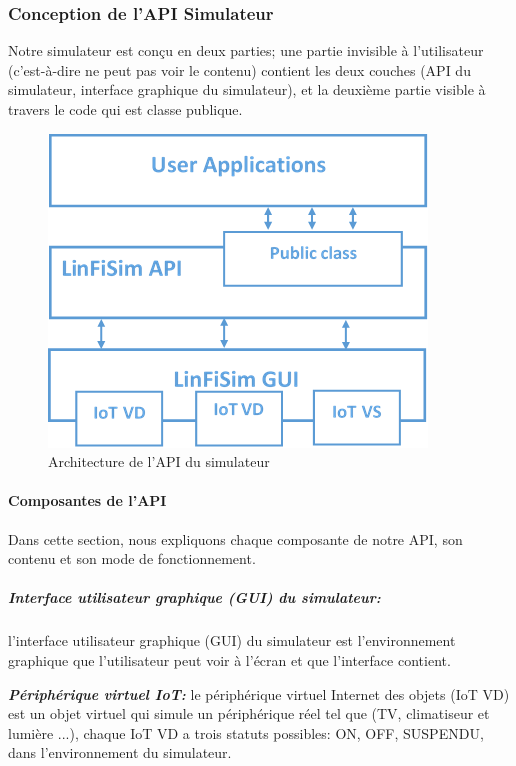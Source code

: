 \subsubsection{Conception de l'API Simulateur}
Notre simulateur est conçu en deux parties; une partie invisible à l'utilisateur (c'est-à-dire ne peut pas voir le contenu) contient les deux couches (API du simulateur, interface graphique du simulateur), et la deuxième partie visible à travers le code qui est classe publique.
\begin{figure}[H]
\centering
\includegraphics[scale=0.8]{chap1/fc15.png}
\caption{Architecture de l'API du simulateur}
\label{fc14}
\end{figure}

\paragraph{Composantes de l'API} Dans cette section, nous expliquons chaque composante de notre API, son contenu et son mode de fonctionnement.
\subparagraph{Interface utilisateur graphique (GUI) du simulateur:} l'interface utilisateur graphique (GUI) du simulateur est l'environnement graphique que l'utilisateur peut voir à l'écran et que l'interface contient.

\textbf{\textit{Périphérique virtuel IoT:}} le périphérique virtuel Internet des objets (IoT VD) est un objet virtuel qui simule un périphérique réel tel que (TV, climatiseur et lumière ...), chaque IoT VD a trois statuts possibles: {ON, OFF, SUSPENDU}, dans l'environnement du simulateur.

